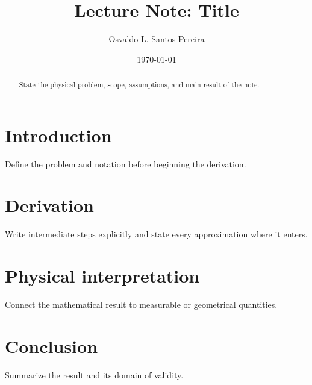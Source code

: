 \documentclass[11pt,a4paper]{article}
\title{Lecture Note: Title}
\author{Osvaldo L. Santos-Pereira}
\date{\today}
\begin{document}
\maketitle

\begin{abstract}
State the physical problem, scope, assumptions, and main result of the note.
\end{abstract}

\tableofcontents

\section{Introduction}

Define the problem and notation before beginning the derivation.

\section{Derivation}

Write intermediate steps explicitly and state every approximation where it enters.

\section{Physical interpretation}

Connect the mathematical result to measurable or geometrical quantities.

\section{Conclusion}

Summarize the result and its domain of validity.



\end{document}
